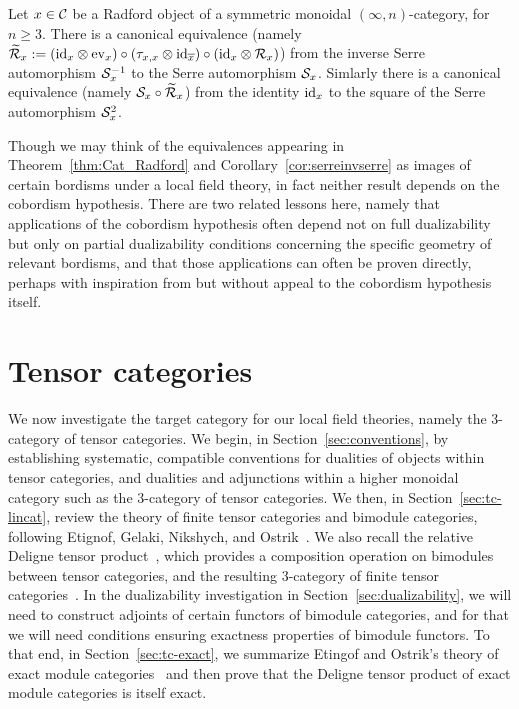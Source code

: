 \documentclass{amsart}
\begin{document}
\begin{corollary}\label{cor:serreinvserre}
Let $x \in \mathcal C$ be a Radford object of a symmetric monoidal $(\infty,n)$-category, for $n \geq 3$.  There is a canonical equivalence (namely $\widetilde{\mathcal R}_x := (\mathrm{id}_{x} \otimes \mathrm{ev}_{x}) \circ (\tau_{x, x} \otimes \mathrm{id}_{\overline{x}}) \circ (\mathrm{id}_{x} \otimes \mathcal R_x)$) from the inverse Serre automorphism $\mathcal S_x^{-1}$ to the Serre automorphism $\mathcal S_x$.  Simlarly there is a canonical equivalence (namely $\mathcal S_x \circ \widetilde{\mathcal R}_x$) from the identity $\mathrm{id}_x$ to the square of the Serre automorphism $\mathcal S_x^2$.
\end{corollary}

Though we may think of the equivalences appearing in Theorem~\ref{thm:Cat_Radford} and Corollary~\ref{cor:serreinvserre} as images of certain bordisms under a local field theory, in fact neither result depends on the cobordism hypothesis.  There are two related lessons here, namely that applications of the cobordism hypothesis often depend not on full dualizability but only on partial dualizability conditions concerning the specific geometry of relevant bordisms, and that those applications can often be proven directly, perhaps with inspiration from but without appeal to the cobordism hypothesis itself.



\section{Tensor categories} \label{sec:tc}


We now investigate the target category for our local field theories, namely the 3-category of tensor categories.  We begin, in Section~\ref{sec:conventions}, by establishing systematic, compatible conventions for dualities of objects within tensor categories, and dualities and adjunctions within a higher monoidal category such as the 3-category of tensor categories.  We then, in Section~\ref{sec:tc-lincat}, review the theory of finite tensor categories and bimodule categories, following Etignof, Gelaki, Nikshych, and Ostrik~\cite{MR1976459,MR2183279,MR2097289, 0909.3140, EGNO}.  We also recall the relative Deligne tensor product~\cite{0909.3140,BTP}, which provides a composition operation on bimodules between tensor categories, and the resulting 3-category of finite tensor categories~\cite{3TC}.  In the dualizability investigation in Section~\ref{sec:dualizability}, we will need to construct adjoints of certain functors of bimodule categories, and for that we will need conditions ensuring exactness properties of bimodule functors.  To that end, in Section~\ref{sec:tc-exact}, we summarize Etingof and Ostrik's theory of exact module categories~\cite{EO-ftc} and then prove that the Deligne tensor product of exact module categories is itself exact.  
\end{document}
